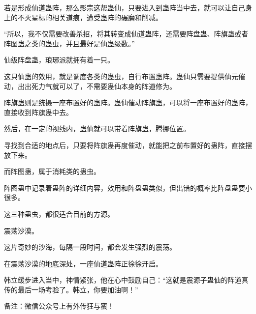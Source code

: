 \begin{this_body}
若是形成仙道蛊阵，那么影宗这帮蛊仙，只要进入到蛊阵当中去，就可以让自己身上的不灭星标的相关道痕，遭受蛊阵的碾磨和削减。

“所以，我不仅需要改善杀招，将其转变成仙道蛊阵，还需要阵盘蛊、阵旗蛊或者阵图蛊之类的蛊虫，并且最好是仙蛊级数。”

仙级阵盘蛊，琅琊派就拥有着一只。

这只仙蛊的效用，就是调度各类的蛊虫，自行布置蛊阵。蛊仙只需要提供仙元催动，出出死力气就可以了，不需要蛊仙本身的阵道修为。

阵旗蛊则是统摄一座布置好的蛊阵。蛊仙催动阵旗蛊，可以将一座布置好的蛊阵，直接收到阵旗蛊中去。

然后，在一定的视线内，蛊仙就可以带着阵旗蛊，腾挪位置。

寻找到合适的地点后，只要将阵旗蛊再度催动，就能把之前布置好的蛊阵，直接摆放下来。

而阵图蛊，属于消耗类的蛊虫。

阵图蛊中记录着蛊阵的详细内容，效用和阵盘蛊类似，但出错的概率比阵盘蛊要小很多。

这三种蛊虫，都很适合目前的方源。

震荡沙漠。

这片奇妙的沙海，每隔一段时间，都会发生强烈的震荡。

在震荡沙漠的地底深处，一座仙道蛊阵正徐徐开启。

韩立缓步进入当中，神情紧张，他在心中鼓励自己：“这就是震源子蛊仙的阵道真传的最后一场考验了。韩立，你要加油啊！”

备注：微信公众号上有外传狂与蛮！

\end{this_body}

